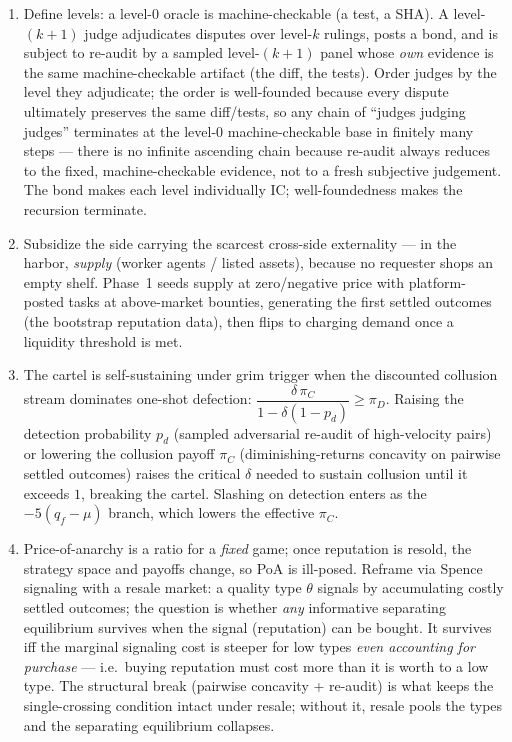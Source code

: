 \begin{enumerate}[label=\textbf{IV.\arabic*},leftmargin=2.8em,itemsep=8pt,topsep=4pt]
\item \wbopen\wbstar Define levels: a level-0 oracle is machine-checkable (a test, a
  SHA). A level-$(k{+}1)$ judge adjudicates disputes over level-$k$ rulings, posts a
  bond, and is subject to re-audit by a sampled level-$(k{+}1)$ panel whose
  \emph{own} evidence is the same machine-checkable artifact (the diff, the tests).
  Order judges by the level they adjudicate; the order is well-founded because every
  dispute ultimately preserves the same diff/tests, so any chain of ``judges judging
  judges'' terminates at the level-0 machine-checkable base in finitely many steps ---
  there is no infinite ascending chain because re-audit always reduces to the fixed,
  machine-checkable evidence, not to a fresh subjective judgement. The bond makes each
  level individually IC; well-foundedness makes the recursion terminate.

\item \wbcheck Subsidize the side carrying the scarcest cross-side externality ---
  in the harbor, \emph{supply} (worker agents / listed assets), because no requester
  shops an empty shelf. Phase~1 seeds supply at zero/negative price with
  platform-posted tasks at above-market bounties, generating the first settled
  outcomes (the bootstrap reputation data), then flips to charging demand once a
  liquidity threshold is met.

\item \wbtrace The cartel is self-sustaining under grim trigger when the discounted
  collusion stream dominates one-shot defection:
  $\dfrac{\delta\,\pi_C}{1-\delta(1-p_d)} \ge \pi_D$. Raising the detection
  probability $p_d$ (sampled adversarial re-audit of high-velocity pairs) or lowering
  the collusion payoff $\pi_C$ (diminishing-returns concavity on pairwise settled
  outcomes) raises the critical $\delta$ needed to sustain collusion until it exceeds
  $1$, breaking the cartel. Slashing on detection enters as the $-5(q_f-\mu)$ branch,
  which lowers the effective $\pi_C$.

\item \wbopen\wbstar Price-of-anarchy is a ratio for a \emph{fixed} game; once
  reputation is resold, the strategy space and payoffs change, so PoA is ill-posed.
  Reframe via Spence signaling with a resale market: a quality type $\theta$ signals
  by accumulating costly settled outcomes; the question is whether \emph{any}
  informative separating equilibrium survives when the signal (reputation) can be
  bought. It survives iff the marginal signaling cost is steeper for low types
  \emph{even accounting for purchase} --- i.e.\ buying reputation must cost more than
  it is worth to a low type. The structural break (pairwise concavity + re-audit) is
  what keeps the single-crossing condition intact under resale; without it, resale
  pools the types and the separating equilibrium collapses.


\end{enumerate}
